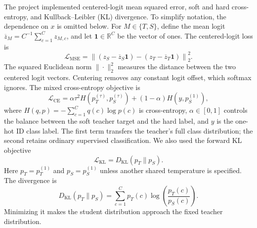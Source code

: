 \headingindent
The project implemented centered-logit mean squared error, soft and hard
cross-entropy, and Kullback--Leibler (KL) divergence. To simplify notation, the
dependence on $x$ is omitted below. For $M\in\{T,S\}$, define the mean logit
$\overline z_M=C^{-1}\sum_{c=1}^{C}z_{M,c}$, and let
$\mathbf 1\in\mathbb R^C$ be the vector of ones. The centered-logit loss is
\[
  \mathcal L_{\mathrm{MSE}}
  =\left\|\left(z_S-\overline z_S\mathbf 1\right)
  -\left(z_T-\overline z_T\mathbf 1\right)\right\|_2^2.
\]
The squared Euclidean norm $\|\cdot\|_2^2$ measures the distance between the
two centered logit vectors. Centering removes any constant logit offset, which
softmax ignores. The mixed cross-entropy objective is
\[
  \mathcal L_{\mathrm{CE}}
  =\alpha \tau^2 H\!\left(p_T^{(\tau)},p_S^{(\tau)}\right)
   +(1-\alpha)H\!\left(y,p_S^{(1)}\right),
\]
where $H(q,p)=-\sum_{c=1}^{C}q(c)\log p(c)$ is cross-entropy,
$\alpha\in[0,1]$ controls the balance between the soft teacher target and the
hard label, and $y$ is the one-hot ID class label. The first term transfers the
teacher's full class distribution; the second retains ordinary supervised
classification. We also used the forward KL objective
\[
  \mathcal L_{\mathrm{KL}}
  =D_{\mathrm{KL}}\!\left(p_T\parallel p_S\right).
\]
Here $p_T=p_T^{(1)}$ and $p_S=p_S^{(1)}$ unless another shared temperature is
specified. The divergence is
\[
  D_{\mathrm{KL}}(p_T\parallel p_S)
  =\sum_{c=1}^{C}p_T(c)\log\!\left(\frac{p_T(c)}{p_S(c)}\right).
\]
Minimizing it makes the student distribution approach the fixed teacher
distribution.




